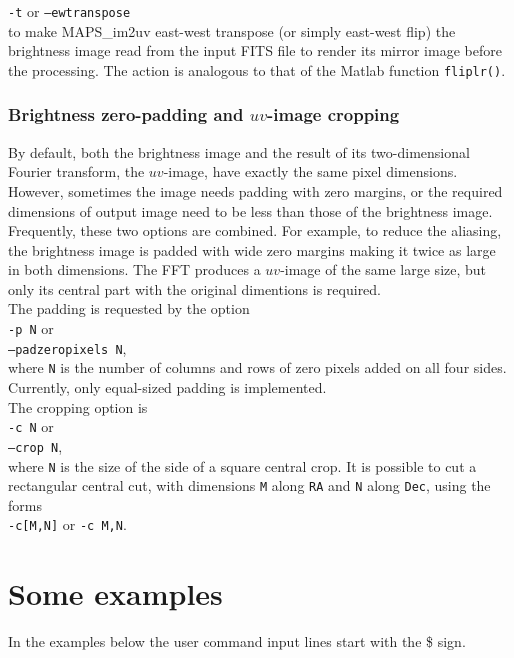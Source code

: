 \documentclass[letterpaper, twoside, 12pt]{article}
\begin{document}
{\tt -t} or {\tt --ewtranspose} \\

to make MAPS\_im2uv east-west transpose (or simply east-west flip) the 
brightness image read from the input FITS file to render its mirror image 
before the processing. The action is analogous to that of the Matlab function 
{\tt fliplr()}. 

\subsubsection*{Brightness zero-padding and $uv$-image cropping}
By default, both the brightness image and the result of its two-dimensional Fourier transform, the $uv$-image, have exactly the same pixel dimensions. However, sometimes the image needs padding with zero margins, or the required dimensions of output image need to be less than those of the brightness image. Frequently, these two options are combined. For example, to reduce the aliasing, the brightness image is padded with wide zero margins making it twice as large in both dimensions. The FFT produces a $uv$-image of the same large size, but only its central part with the original dimentions is required. \\

The padding is requested by the option \\

{\tt -p N} or \\ {\tt --padzeropixels N},\\

where {\tt N} is the number of columns and rows of zero pixels added on all four sides. Currently, only equal-sized padding is implemented. \\

The cropping option is \\ 

{\tt -c N} or \\ {\tt --crop N},\\

where {\tt N} is the size of the side of a square central crop. It is possible to cut a rectangular central cut, with dimensions {\tt M} along {\tt RA} and {\tt N} along {\tt Dec}, using the forms \\

{\tt -c[M,N]} or  {\tt -c M,N}.\\
  


\section*{Some examples}
In the examples below the user command input lines start with the \$ sign.
\end{document}
